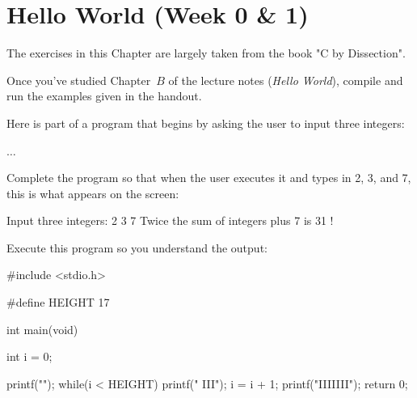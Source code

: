 \pagestyle{fancy} %




\chapter{Hello World (Week 0 \& 1)}

The exercises in this Chapter are largely taken from the book "C by Dissection".


\begin{exercise}
Once you've studied Chapter~$B$ of the lecture notes ({\em Hello World}), compile and run the examples given in the handout.
\end{exercise}

Here is part of a program that begins by asking the user to input three
integers:
\begin{codesnippet}
#include <stdio.h>

int main(void)
{
   int a, b, c;

   printf("Input three integers: ");
\end{codesnippet}
$\ldots$\\

\begin{exercise}
Complete the program so that when the user executes it and types in 2, 3,
and 7, this is what appears on the screen:
\begin{terminaloutput}
Input three integers: 2 3 7
Twice the sum of integers plus 7 is 31 !
\end{terminaloutput}
\end{exercise}


Execute this program so you understand the output:

\begin{codesnippet}
#include <stdio.h>

#define HEIGHT 17

int main(void)
{

   int i = 0;

   printf("\n\nIIIIIII\n");
   while(i < HEIGHT){
      printf("  III\n");
      i = i + 1;
   }
   printf("IIIIIII\n\n\n");
   return 0;

}
\end{codesnippet}

